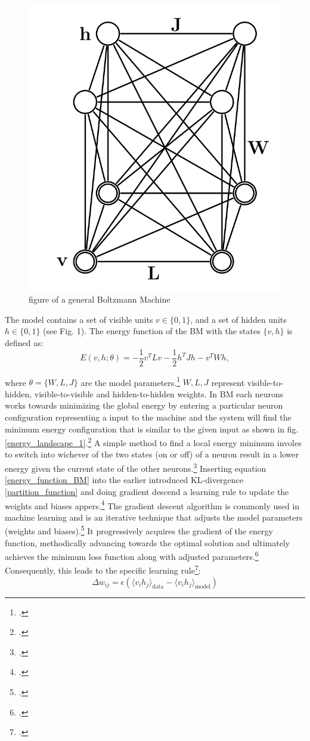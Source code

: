 \begin{figure}[H]
    \centering
    \includegraphics[width=0.25\linewidth]{graphics/General_BM.png}
    \caption{figure of a general Boltzmann Machine}
    \label{fig1}
\end{figure}
The model contains a set of visible units \( v \in \{0, 1\} \), and a set of hidden units \( h \in \{0, 1\} \) (see Fig. 1). The energy function of the \ac{BM} with the states \( \{v, h\} \) is defined as:
\begin{equation}
E(v, h; \theta) = -\frac{1}{2} v^T L v - \frac{1}{2} h^T J h - v^T W h,
\label{energy_function_BM}
\end{equation}

where \( \theta = \{W, L, J\} \) are the model parameters.\footcite[cf.][448]{salakhutdinovDeepBoltzmannMachines2009}
\( W, L, J \) represent visible-to-hidden, visible-to-visible and hidden-to-hidden weights.
In \ac{BM} each neurons works towards minimizing the global energy by 
entering a particular neuron configuration representing a input to the machine and the system will find the minimum energy configuration that is similar to the given input as shown in fig.\ref{energy_landscape_1}.\footcite[cf.][150]{ackleyLearningAlgorithmBoltzmann1985}
A simple method to find a local energy minimum involes to switch into wichever of the two states (on or off) of a neuron result in a lower energy given the current state of the other neurons.\footcite[cf.][110]{fahlmanMassivelyParallelArchitectures1983}    
Inserting equation \eqref{energy_function_BM} into the earlier introduced KL-divergence \eqref{partition_function} and doing gradient descend a learning rule to update the weights and biases appers.\footcite[cf.][5]{hintonPracticalGuideTraining2012}
The gradient descent algorithm is commonly used in machine learning and is an iterative technique that adjusts the model parameters (weights and biases).\footcite[cf.][11]{wangResearchApplicationGradient2021}
It progressively acquires the gradient of the energy function, methodically advancing towards the optimal solution and ultimately achieves the minimum loss function along with adjusted parameters.\footcite[cf.][11]{wangResearchApplicationGradient2021}
Consequently, this leads to the specific learning rule\footcite[cf.][5]{hintonPracticalGuideTraining2012}:
\begin{equation}
    \Delta w_{ij} = \epsilon ( \langle v_i h_j \rangle_{\text{data}} - \langle v_i h_j \rangle_{\text{model}} )
    \label{Update_weights}
\end{equation}


